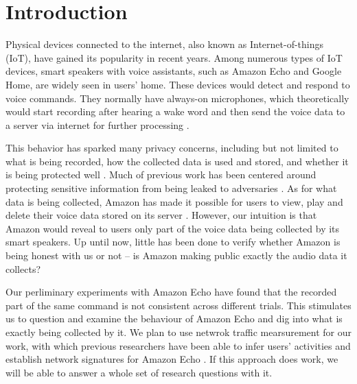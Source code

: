 \section{Introduction}
Physical devices connected to the internet, also known as Internet-of-things (IoT), have gained its popularity in recent years. Among numerous types of IoT devices, smart speakers with voice assistants, such as Amazon Echo and Google Home, are widely seen in users' home. These devices would detect and respond to voice commands. They normally have always-on microphones, which theoretically would start recording after hearing a wake word and then send the voice data to a server via internet for further processing \cite{AmazonEc68:online}.

This behavior has sparked many privacy concerns, including but not limited to what is being recorded, how the collected data is used and stored, and whether it is being protected well \cite{lau2018alexa, fowler_2019, apthorpe2017smart, apthorpe2019keeping, apthorpe2017spying}. Much of previous work has been centered around protecting sensitive information from being leaked to adversaries \cite{apthorpe2017smart, apthorpe2019keeping, apthorpe2017spying}. As for what data is being collected, Amazon has made it possible for users to view, play and delete their voice data stored on its server \cite{ford2019alexa}. However, our intuition is that Amazon would reveal to users only part of the voice data being collected by its smart speakers. Up until now, little has been done to verify whether Amazon is being honest with us or not -- is Amazon making public exactly the audio data it collects?

Our perliminary experiments with Amazon Echo have found that the recorded part of the same command is not consistent across different trials. This stimulates us to question and examine the behaviour of Amazon Echo and dig into what is exactly being collected by it. We plan to use netwrok traffic mearsurement for our work, with which previous researchers have been able to infer users' activities \cite{apthorpe2017spying} and establish network signatures for Amazon Echo \cite{ford2019alexa}. If this approach does work, we will be able to answer a whole set of research questions with it.
